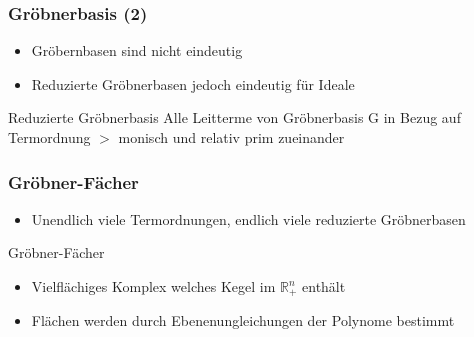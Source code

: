 \documentclass{beamer}
\begin{document}

\begin{frame}[fragile]
\frametitle{Gröbnerbasis (2)}

\begin{itemize}
\item Gröbernbasen sind nicht eindeutig

\item Reduzierte Gröbnerbasen jedoch eindeutig für Ideale
\end{itemize}

\begin{block}{Reduzierte Gröbnerbasis}
Alle Leitterme von Gröbnerbasis G in Bezug auf Termordnung $>$ monisch und relativ prim zueinander 
\end{block}




\end{frame}













\begin{frame}[fragile]
\frametitle{Gröbner-Fächer}
\begin{itemize}
\item Unendlich viele Termordnungen, endlich viele reduzierte Gröbnerbasen

\end{itemize}

\begin{block}{Gröbner-Fächer}
\begin{itemize}
\item Vielflächiges Komplex welches Kegel im $\mathbb{R}^{n}_{+}$ enthält
\item Flächen werden durch Ebenenungleichungen der Polynome bestimmt 
\end{itemize}

\end{block}

\end{frame}
\end{document}
